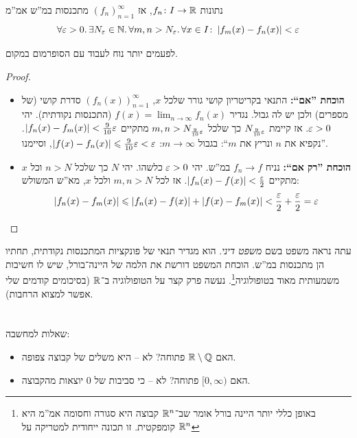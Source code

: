 \documentclass[name=רשימות חדו''א 2א]{../../../tex/classes/noChapterMegasumPreamble}
\begin{document}
	\begin{Theorem}
		נתונות $f_n \colon I \to \mathbb{R}$, אז $(f_n)_{n = 1}^{\infty}$ מתכנסות במ''ש אמ''מ
		\[ \forall \eg > 0.\, \exists N_\eg \in \N.\, \forall m, n > N_\eg.\, \forall x \in I \co \sof{f_m(x) - f_n(x)} < \eg \]
	\end{Theorem}
	לפעמים יותר נוח לעבוד עם הסופרמום במקום.
	\begin{proof}
		\begin{itemize}
			\item \textbf{הוכחת ''אם``: }התנאי בקריטריון קושי גורר שלכל $x$, $(f_n(x))_{n = 1}^{\infty}$ סדרת קושי (של מספרים) ולכן יש לה גבול. נגדיר $f(x) = \lim_{n \to \infty}f_n(x)$ (התכנסות נקודתית). יהי $\eg > 0$. אז קיימת $N_{\frac{9}{10}\eg}$ כך שלכל $m, n > N_{\frac{9}{10}\eg}$ מתקיים $\sof{f_n(x) - f_m(x)} < \frac{9}{10}\eg$. ''נקפיא את $n$ ונריץ את $m$``:
			בגבול $m \to \infty$: $\sof{f(x) - f_n(x)} \le \frac{9}{10}\eg < \eg$, וסיימנו.
			\item \textbf{הוכחת ''רק אם``: }נניח $f_n \to f$ במ''ש. יהי $\eg > 0$ כלשהו. יהי $N$ כך שלכל $n > N$ וכל $x$ מתקיים $\sof{f_n(x) - f(x)} < \frac{\eg}{2}$. אז לכל $m, n > N$ ולכל $x$, מא''ש המשולש:
			\[ \sof{f_n(x) - f_m(x)} \le \sof{f_n(x) - f(x)} + \sof{f(x) - f_m(x)} < \frac{\eg}{2} + \frac{\eg}{2} = \eg \]
		\end{itemize}
	\end{proof}

	עתה נראה משפט בשם \textit{משפט דיני}. הוא מגדיר תנאי של פונקציות המתכנסות נקודתית, תחתיו הן מתכנסות במ''ש. הוכחת המשפט דורשת את הלמה של היינה־בורל, שיש לו חשיבות משמעותית מאוד בטופולוגיה\footnote{באופן כללי יותר היינה בורל אומר שב־$\mathbb{R}^{n}$ קבוצה היא סגורה וחסומה אמ''מ היא קומפקטית. זו תכונה ייחודית למטריקה על $\mathbb{R}^{n}$}. נעשה פרק קצר על הטופולוגיה ב־$\R$ (בסיכומים קודמים שלי אפשר למצוא הרחבות).

	\npage

\section[טופולוגיה ב־$\R$]{}
	שאלות למחשבה:
	\begin{itemize}
		\item האם $\mathbb{R} \setminus \mathbb{Q}$ פתוחה? לא – היא משלים של קבוצה צפופה.
		\item האם $[0, \infty)$ פתוחה? לא – כי סביבות של $0$ יוצאות מהקבוצה.
	\end{itemize}
\end{document}
